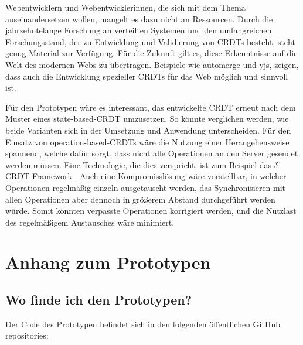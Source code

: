 \documentclass[a4paper, 12pt]{scrreprt}
\begin{document}
Webentwicklern und Webentwicklerinnen, die sich mit dem Thema auseinandersetzen wollen, mangelt es dazu nicht an Ressourcen. Durch die jahrzehntelange Forschung an verteilten Systemen und den umfangreichen Forschungsstand, der zu Entwicklung und Validierung von CRDTs besteht, steht genug Material zur Verfügung. Für die Zukunft gilt es, diese Erkenntnisse auf die Welt des modernen Webs zu übertragen. Beispiele wie automerge und yjs, zeigen, dass auch die Entwicklung spezieller CRDTs für das Web möglich und sinnvoll ist. 

Für den Prototypen wäre es interessant, das entwickelte CRDT erneut nach dem Muster eines state-based-CRDT umzusetzen. So könnte verglichen werden, wie beide Varianten sich in der Umsetzung und Anwendung unterscheiden. Für den Einsatz von operation-based-CRDTs wäre die Nutzung einer Herangehensweise spannend, welche dafür sorgt, dass nicht alle Operationen an den Server gesendet werden müssen. Eine Technologie, die dies verspricht, ist zum Beispiel das $\delta$-CRDT Framework \autocite{articleDeltaCRDT}. Auch eine Kompromisslösung wäre vorstellbar, in welcher Operationen regelmäßig einzeln ausgetauscht werden, das Synchronisieren mit allen Operationen aber dennoch in größerem Abstand durchgeführt werden würde. Somit könnten verpasste Operationen korrigiert werden, und die Nutzlast des regelmäßigem Austausches wäre minimiert.







\newpage
\listoffigures
\newpage
\lstlistoflistings
\newpage
\printbibliography[title ={Literaturquellen}, filter=literatur, sorting=nty]
\printbibliography[type=online, title ={Onlinequellen}]
\printbibliography[filter=other, title = {Weitere Quellen}]
\newpage
\section*{Anhang zum Prototypen}
\subsection*{Wo finde ich den Prototypen?}
Der Code des Prototypen befindet sich in den folgenden öffentlichen GitHub repositories:
\end{document}
